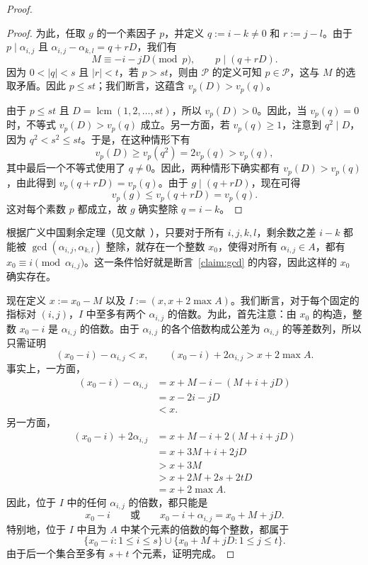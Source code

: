 \documentclass[UTF8,a4paper,oneside,openany,fontset=fandol,zihao=-4]{ctexbook}
\theoremstyle{chinesestyle}
\begin{document}
\begin{proof}
\begin{proof}
为此，任取 $g$ 的一个素因子 $p$，并定义 $q:=i-k\ne0$ 和 $r:=j-l$。由于 $p\mid\alpha_{i,j}$ 且 $\alpha_{i,j}-\alpha_{k,l}=q+rD$，我们有
\[
M\equiv-i-jD\pmod p,
\qquad
p\mid(q+rD).
\]
因为 $0<|q|<s$ 且 $|r|<t$，若 $p>st$，则由 $\mathcal P$ 的定义可知 $p\in\mathcal P$，这与 $M$ 的选取矛盾。因此 $p\leq st$；我们断言，这蕴含 $v_p(D)>v_p(q)$。

由于 $p\leq st$ 且 $D=\operatorname{lcm}(1,2,\ldots,st)$，所以 $v_p(D)>0$。因此，当 $v_p(q)=0$ 时，不等式 $v_p(D)>v_p(q)$ 成立。另一方面，若 $v_p(q)\geq1$，注意到 $q^2\mid D$，因为 $q^2<s^2\leq st$。于是，在这种情形下有
\[
v_p(D)\geq v_p(q^2)=2v_p(q)>v_p(q),
\]
其中最后一个不等式使用了 $q\ne0$。因此，两种情形下确实都有 $v_p(D)>v_p(q)$，由此得到 $v_p(q+rD)=v_p(q)$。由于 $g\mid(q+rD)$，现在可得
\[
v_p(g)\leq v_p(q+rD)=v_p(q).
\]
这对每个素数 $p$ 都成立，故 $g$ 确实整除 $q=i-k$。
\end{proof}

根据广义中国剩余定理（见文献~\cite[定理~3.12]{ref12}），只要对于所有 $i,j,k,l$，剩余数之差 $i-k$ 都能被 $\gcd(\alpha_{i,j},\alpha_{k,l})$ 整除，就存在一个整数 $x_0$，使得对所有 $\alpha_{i,j}\in A$，都有 $x_0\equiv i\pmod{\alpha_{i,j}}$。这一条件恰好就是断言~\ref{claim:gcd} 的内容，因此这样的 $x_0$ 确实存在。

现在定义 $x:=x_0-M$ 以及 $I:=(x,x+2\max A)$。我们断言，对于每个固定的指标对 $(i,j)$，$I$ 中至多有两个 $\alpha_{i,j}$ 的倍数。为此，首先注意：由 $x_0$ 的构造，整数 $x_0-i$ 是 $\alpha_{i,j}$ 的倍数。由于 $\alpha_{i,j}$ 的各个倍数构成公差为 $\alpha_{i,j}$ 的等差数列，所以只需证明
\[
(x_0-i)-\alpha_{i,j}<x,
\qquad
(x_0-i)+2\alpha_{i,j}>x+2\max A.
\]
事实上，一方面，
\begin{align*}
(x_0-i)-\alpha_{i,j}
&=x+M-i-(M+i+jD)\\
&=x-2i-jD\\
&<x.
\end{align*}
另一方面，
\begin{align*}
(x_0-i)+2\alpha_{i,j}
&=x+M-i+2(M+i+jD)\\
&=x+3M+i+2jD\\
&>x+3M\\
&>x+2M+2s+2tD\\
&=x+2\max A.
\end{align*}
因此，位于 $I$ 中的任何 $\alpha_{i,j}$ 的倍数，都只能是
\[
x_0-i
\qquad\text{或}\qquad
x_0-i+\alpha_{i,j}=x_0+M+jD.
\]
特别地，位于 $I$ 中且为 $A$ 中某个元素的倍数的每个整数，都属于
\[
\{x_0-i:1\leq i\leq s\}\cup\{x_0+M+jD:1\leq j\leq t\}.
\]
由于后一个集合至多有 $s+t$ 个元素，证明完成。
\end{proof}
\end{document}
